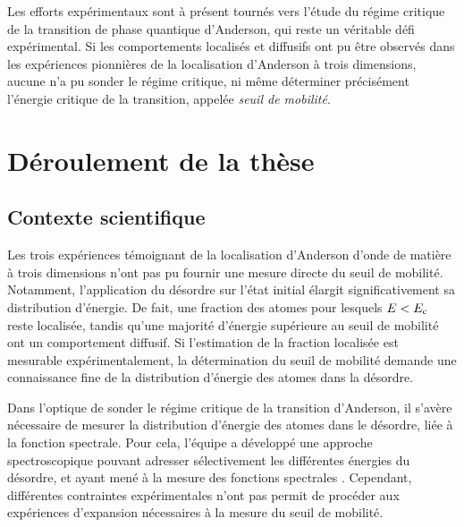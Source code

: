 Les efforts expérimentaux sont à présent tournés vers l'étude du régime critique de la transition de phase quantique d'Anderson, qui reste un véritable défi expérimental. Si les comportements localisés et diffusifs ont pu être observés dans les expériences pionnières de la localisation d'Anderson à trois dimensions, aucune n'a pu sonder le régime critique, ni même déterminer précisément l'énergie critique de la transition, appelée \emph{seuil de mobilité}.




\section{Déroulement de la thèse}

\subsection{Contexte scientifique}
Les trois expériences témoignant de la localisation d'Anderson d'onde de matière à trois dimensions n'ont pas pu fournir une mesure directe du seuil de mobilité. Notamment, l'application du désordre sur l'état initial élargit significativement sa distribution d'énergie. De fait, une fraction des atomes pour lesquels $E<E_{\mathrm{c}}$ reste localisée, tandis qu'une majorité d'énergie supérieure au seuil de mobilité ont un comportement diffusif. Si l'estimation de la fraction localisée est mesurable expérimentalement, la détermination du seuil de mobilité demande une connaissance fine de la distribution d'énergie des atomes dans la désordre.

Dans l'optique de sonder le régime critique de la transition d'Anderson, il s'avère nécessaire de mesurer la distribution d'énergie des atomes dans le désordre, liée à la fonction spectrale\citep{pasek2017anderson}. Pour cela, l'équipe a développé une approche spectroscopique pouvant adresser sélectivement les différentes énergies du désordre, et ayant mené à la mesure des fonctions spectrales \citep{volchkov2018measurement}\citep{denechaud2018vers}. Cependant, différentes contraintes expérimentales n'ont pas permit de procéder aux expériences d'expansion nécessaires à la mesure du seuil de mobilité.

